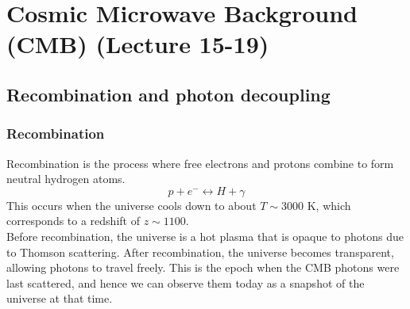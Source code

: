 
\chapter{Cosmic Microwave Background (CMB) (Lecture 15-19)}
\section{Recombination and photon decoupling}
\subsection{Recombination}
\begin{intuition}
    Recombination is the process where free electrons and protons combine to form neutral hydrogen atoms. 
    \[
        p + e^- \leftrightarrow H + \gamma
    \]
    This occurs when the universe cools down to about $T\sim 3000$ K, which corresponds to a redshift of $z\sim 1100$. \\
    
    Before recombination, the universe is a hot plasma that is opaque to photons due to Thomson scattering. After recombination, the universe becomes transparent, allowing photons to travel freely. This is the epoch when the CMB photons were last scattered, and hence we can observe them today as a snapshot of the universe at that time.
\end{intuition}

